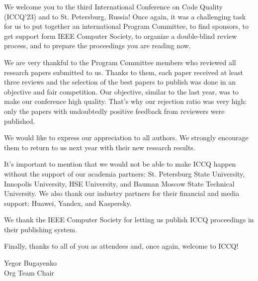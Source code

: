 \cleardoublepage
{}

We welcome you to the third International Conference on Code Quality (ICCQ'23)
and to St. Petersburg, Russia! Once again, it was a challenging task for us
to put together an international Program Committee,
to find sponsors,
to get support form IEEE Computer Society,
to organize a double-blind review process,
and to prepare the proceedings you are reading now.

We are very thankful to the Program Committee members who
reviewed all research papers submitted to us. Thanks to them,
each paper received at least three reviews and the selection of the best papers to publish
was done in an objective and fair competition. Our objective,
similar to the last year, was to make our conference high quality.
That's why our rejection ratio was very high: only the
papers with undoubtedly positive feedback from reviewers were published.

We would like to express our appreciation to all authors.
We strongly encourage them to return to us next year
with their new research results.

It's important to mention that we would not be able to make
ICCQ happen without the support of our academia partners:
St. Petersburg State University,
Innopolis University,
HSE University,
and
Bauman Moscow State Technical University.
We also thank our industry partners for their financial and media support:
Huawei, Yandex, and Kaspersky.

We thank the IEEE Computer Society for letting us publish ICCQ proceedings
in their publishing system.

Finally, thanks to all of you as attendees and, once again, welcome to ICCQ!

\vspace{18pt}
Yegor Bugayenko\\
Org Team Chair
